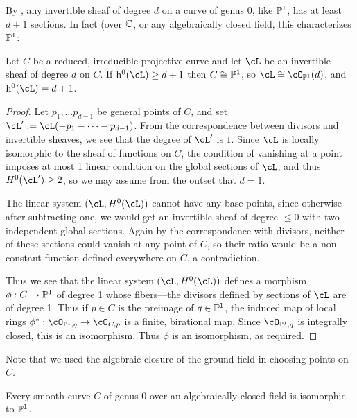 

By \trr, any invertible sheaf of degree $d$ on a curve of genus 0, like $\PP^1$, has at least $d+1$ sections. In fact (over $\CC$, or any algebraically
closed field, this characterizes $\PP^1$:

\begin{theorem}\label{characterization of P1}
Let $C$ be a reduced, irreducible projective curve and let $\cL$ be an invertible sheaf of degree $d$ on $C$. If $\h^0(\cL) \geq d+1$ then
$C \cong \PP^1$, so $\cL \cong \cO_{\PP^1}(d)$, and $\h^0(\cL) = d+1$. 
\end{theorem}

\begin{proof}
Let $p_1,\dots p_{d-1}$ be general points of $C$, and set $\cL':=\cL(-p_1-\cdots-p_{d-1})$. From the correspondence between divisors and
invertible sheaves, we see that the degree of $\cL'$ is $1$.
 Since $\cL$ is locally isomorphic to the sheaf of functions on $C$, the condition of vanishing at a point imposes at most 1 linear condition on 
the global sections of $\cL$, and thus $H^0(\cL') \geq 2$, so we may assume from the outset that $d =1$.

The linear system $(\cL, H^0(\cL))$ cannot have any base points, since
otherwise after subtracting one, we would get an invertible sheaf of degree $\leq 0$ with two independent global sections. Again by the correspondence
with divisors, neither of these sections could vanish at any point of $C$, so their ratio would be a non-constant function defined everywhere on $C$,
a contradiction.

Thus we see that the linear system $(\cL, H^0(\cL))$ defines a morphism $\phi: C\to \PP^1$ of degree 1 whose fibers---the divisors defined by
sections of $\cL$ are of degree 1. Thus if $p\in C$ is the preimage of $q\in \PP^1$, the induced map of local rings
$\phi^*:\cO_{\PP^1, q} \to \cO_{C, p}$ is a finite, birational map. Since $\cO_{\PP^1, q}$ is integrally closed, this is an isomorphism. Thus 
$\phi$ is an isomorphism, as required. 
 \end{proof}

Note that we used the algebraic closure of the ground field in choosing points on $C$.


\begin{corollary}
 Every smooth curve $C$ of genus 0 over an algebraically closed field is isomorphic to $\PP^1$.
\end{corollary}

